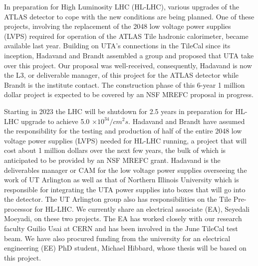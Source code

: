 In preparation for High Luminosity LHC (HL-LHC), various upgrades of the ATLAS detector to cope with the new conditions are being planned. One of these projects, involving the replacement of the 2048 low voltage power supplies (LVPS) 
required for operation of the ATLAS Tile hadronic calorimeter, became available last year.  
Building on UTA's connections in the TileCal since its inception, Hadavand and Brandt assembled a group and proposed that UTA take over this project. 
Our proposal was well-received, consequently, Hadavand is now the L3, or deliverable manager, of this project for the ATLAS detector while Brandt is the institute contact. The construction phase of this 6-year 
1 million dollar project is expected to be covered by an NSF MREFC proposal in progress. 

Starting in 2023 the LHC will be shutdown for 2.5 years in preparation for HL-LHC upgrade to achieve 5.0 $\times 10^{34}/cm^2s$. 
Hadavand and Brandt have assumed the responsibility for the testing and production of half of the entire 2048 low voltage power supplies (LVPS) needed for HL-LHC running, 
a project that will cost about 1 million dollars over the next few years, the bulk of which is anticipated to be provided by an NSF MREFC grant. 
Hadavand is the deliverables manager or CAM for the low voltage 
power supplies overseeing the work of UT Arlington as well as that of Northern Illinois University which is responsible for integrating the UTA power supplies into boxes that will go into the detector.
The UT Arlington group also has responsibilities on the Tile Pre-processor for HL-LHC.  We currently
share an electrical associate (EA), Seyedali Moeyadi, on these two projects.  The EA has worked closely with our research faculty Guilio Usai at CERN and has been involved in the June TileCal test beam.  We have also procured
funding from the university for an electrical engineering (EE) PhD student, Michael Hibbard, whose thesis will be based on this project.  

